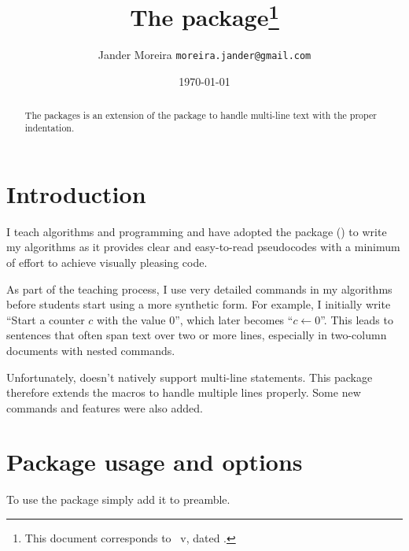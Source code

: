 \documentclass[a4paper, 11pt]{article}
\title{The \PackageName{algxpar} package\thanks{This document corresponds to \PackageName{algxpar}~v\AlgVersion, dated \AlgDate.}}
\author{Jander Moreira \texttt{moreira.jander@gmail.com}}
\date{\today}
\begin{document}
\maketitle
\sloppy

\begin{abstract}
    The  packages is an extension of the  package to handle multi-line text with the proper indentation.
\end{abstract}

\tableofcontents

\vspace{2em}



\section{Introduction}
I teach algorithms and programming and have adopted the  package () to write my algorithms as it provides clear and easy-to-read pseudocodes with a minimum of effort to achieve visually pleasing code.

As part of the teaching process, I use very detailed commands in my algorithms before students start using a more synthetic form. For example, I initially write ``Start a counter $c$ with the value $0$'', which later becomes ``${c \gets 0}$''. This leads to sentences that often span text over two or more lines, especially in two-column documents with nested commands.

Unfortunately,  doesn't natively support multi-line statements. This package therefore extends the macros to handle multiple lines properly. Some new commands and features were also added.


\section{Package usage and options}\label{sec:package-usage-and-options}
To use the package simply add it to preamble.
\end{document}
